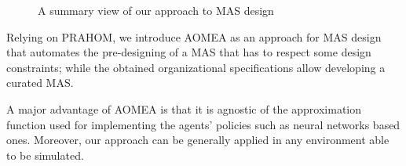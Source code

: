 \documentclass[runningheads]{llncs}
\begin{document}


\begin{figure}[h!]
    \centering
    
    \caption{A summary view of our approach to MAS design}
    \label{fig:design_approach}
\end{figure}

Relying on PRAHOM, we introduce AOMEA as an approach for MAS design that automates the pre-designing of a MAS that has to respect some design constraints; while the obtained organizational specifications allow developing a curated MAS.

A major advantage of AOMEA is that it is agnostic of the approximation function used for implementing the agents' policies such as neural networks based ones. Moreover, our approach can be generally applied in any environment able to be simulated.
\end{document}
